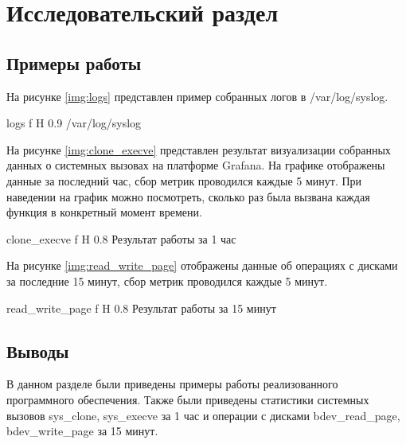 \chapter{Исследовательский раздел}

\section{Примеры работы}

На рисунке \ref{img:logs} представлен пример собранных логов в /var/log/syslog.

{logs}
{f}
{H}
{0.9\textwidth}
{/var/log/syslog}

На рисунке \ref{img:clone_execve} представлен результат визуализации собранных данных о системных вызовах на платформе Grafana. На графике отображены данные за последний час, сбор метрик проводился каждые 5 минут. При наведении на график можно посмотреть, сколько раз была вызвана каждая функция в конкретный момент времени.

{clone_execve}
{f}
{H}
{0.8\textwidth}
{Результат работы за 1 час}

На рисунке \ref{img:read_write_page} отображены данные об операциях с дисками за последние 15 минут, сбор метрик проводился каждые 5 минут.

{read_write_page}
{f}
{H}
{0.8\textwidth}
{Результат работы за 15 минут}

\section{Выводы}

В данном разделе были приведены примеры работы реализованного программного обеспечения. Также были приведены статистики системных вызовов sys\_clone, sys\_execve за 1 час и операции с дисками bdev\_read\_page, bdev\_write\_page за 15 минут.
